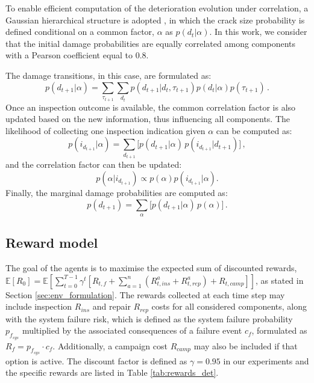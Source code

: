To enable efficient computation of the deterioration evolution under correlation, a Gaussian hierarchical structure is adopted \citep{morato2022syst}, in which the crack size probability is defined conditional on a common factor, $\alpha$ as $p(d_{t}|\alpha)$. In this work, we consider that the initial damage probabilities are equally correlated among components with a Pearson coefficient equal to 0.8. 

The damage transitions, in this case, are formulated as: 
\begin{equation} \label{eq:ex_pod4}
    p(d_{t+1}|\alpha) =  \sum_{\tau_{t+1}} \sum_{d_t} p(d_{t+1}|d_t,\tau_{t+1}) p(d_{t}|\alpha) p(\tau_{t+1}) \, .
\end{equation}
Once an inspection outcome is available, the common correlation factor is also updated based on the new information, thus influencing all components. The likelihood of collecting one inspection indication given $\alpha$ can be computed as:
\begin{equation}\label{Eq:margHyp}
p(i_{d_{t+1}}|\alpha)=\sum_{d_{t+1}} \Big[p(d_{t+1}|\alpha)\,p(i_{d_{t+1}}|d_{t+1})\Big] \, ,
\end{equation}
and the correlation factor can then be updated:
\begin{equation}\label{Eq:infHyp}
p(\alpha|i_{d_{t+1}}) \propto p(\alpha)p(i_{d_{t+1}}|\alpha) .
\end{equation}
Finally, the marginal damage probabilities are computed as:
\begin{equation}\label{Eq:margBel}
p(d_{t+1}) = \sum_{\alpha} \Big[p(d_{t+1}|\alpha)\, p({\alpha}) \Big] \, .
\end{equation}
 
\subsection{Reward model}
The goal of the agents is to maximise the expected sum of discounted rewards, $\mathbb{E}[R_{0}] = \mathbb{E} \left[ \sum_{t=0}^{T-1} \gamma^t \left[ R_{t,f}+ \sum_{a=1}^n \left({R_{t,ins}^a} + {R_{t,rep}^a}\right)+R_{t,camp} \right] \right]$, as stated in Section \ref{sec:env_formulation}.
The rewards collected at each time step may include inspection $R_{ins}$ and repair $R_{rep}$ costs for all considered components, along with the system failure risk, which is defined as the system failure probability $p_{f_{sys}}$ multiplied by the associated consequences of a failure event $c_f$, formulated as $R_f = p_{f_{sys}} \cdot c_f$. Additionally, a campaign cost $R_{camp}$ may also be included if that option is active.
The discount factor is defined as $\gamma=0.95$ in our experiments and the specific rewards are listed in Table \ref{tab:rewards_det}.

